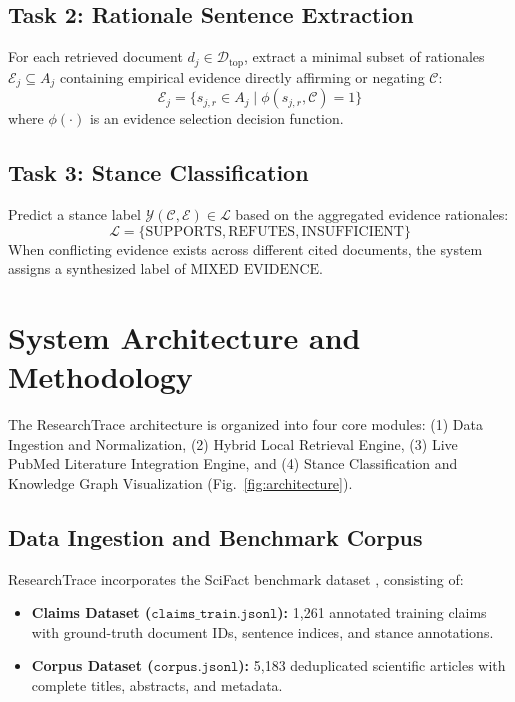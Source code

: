 \documentclass[conference]{IEEEtran}
\begin{document}
\subsection{Task 2: Rationale Sentence Extraction}
For each retrieved document $d_j \in \mathcal{D}_{\text{top}}$, extract a minimal subset of rationales $\mathcal{E}_j \subseteq A_j$ containing empirical evidence directly affirming or negating $\mathcal{C}$:
\begin{equation}
\mathcal{E}_j = \{s_{j,r} \in A_j \mid \phi(s_{j,r}, \mathcal{C}) = 1\}
\end{equation}
where $\phi(\cdot)$ is an evidence selection decision function.

\subsection{Task 3: Stance Classification}
Predict a stance label $\mathcal{Y}(\mathcal{C}, \mathcal{E}) \in \mathcal{L}$ based on the aggregated evidence rationales:
\begin{equation}
\mathcal{L} = \{\text{SUPPORTS}, \text{REFUTES}, \text{INSUFFICIENT}\}
\end{equation}
When conflicting evidence exists across different cited documents, the system assigns a synthesized label of $\text{MIXED EVIDENCE}$.

\section{System Architecture and Methodology}

The ResearchTrace architecture is organized into four core modules: (1) Data Ingestion and Normalization, (2) Hybrid Local Retrieval Engine, (3) Live PubMed Literature Integration Engine, and (4) Stance Classification and Knowledge Graph Visualization (Fig.~\ref{fig:architecture}).

\subsection{Data Ingestion and Benchmark Corpus}
ResearchTrace incorporates the SciFact benchmark dataset \cite{wadden2020scifact}, consisting of:
\begin{itemize}
    \item \textbf{Claims Dataset ($\texttt{claims\_train.jsonl}$):} 1,261 annotated training claims with ground-truth document IDs, sentence indices, and stance annotations.
    \item \textbf{Corpus Dataset ($\texttt{corpus.jsonl}$):} 5,183 deduplicated scientific articles with complete titles, abstracts, and metadata.
\end{itemize}
\end{document}
